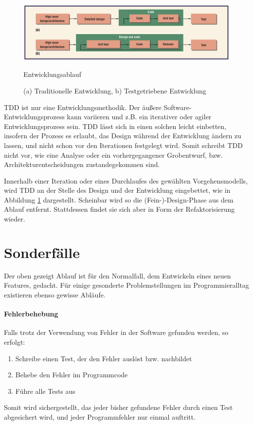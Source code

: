     \begin{figure}[hbtp]
 \centering
 \includegraphics[width=\textwidth]{./diagrams/ablauf.png}
 \caption{Entwicklungsablauf}
 \caption*{(a) Traditionelle Entwicklung,  b) Testgetriebene Entwicklung}
 \label{fig:devflow}
\end{figure}

 TDD ist nur eine Entwicklungsmethodik. Der äußere Software-Entwicklungsprozess kann variieren und z.B. ein iterativer oder agiler Entwicklungsprozess sein. TDD lässt sich in einen solchen leicht einbetten, insofern der Prozess es erlaubt, das Design während der Entwicklung ändern zu lassen, und nicht schon vor den Iterationen festgelegt wird. Somit schreibt TDD nicht vor, wie eine Analyse oder ein vorhergegangener Grobentwurf, bzw. Architekturentscheidungen zustandegekommen sind.

 Innerhalb einer Iteration oder eines Durchlaufes des gewählten Vorgehensmodells, wird TDD an der Stelle des Design und der Entwicklung eingebettet, wie in Abbildung \ref{fig:devflow} dargestellt. Scheinbar wird so die (Fein-)-Design-Phase aus dem Ablauf entfernt. Stattdessen findet sie sich aber in Form der Refaktorisierung wieder.


  \section{Sonderfälle}
  \label{sec:tddspecialcircumstances}

  Der oben gezeigt Ablauf ist für den Normalfall, dem Entwickeln eines neuen Features, gedacht. Für einige gesonderte Problemstellungen im Programmieralltag existieren ebenso gewisse Abläufe.

  \paragraph{Fehlerbehebung} Falls trotz der Verwendung von  Fehler in der Software gefunden werden, so erfolgt:
  \begin{enumerate}
   \item Schreibe einen Test, der den Fehler auslöst bzw. nachbildet
   \item Behebe den Fehler im Programmcode
   \item Führe alle Tests aus
  \end{enumerate}
  Somit wird sichergestellt, das jeder bisher gefundene Fehler durch einen Test abgesichert wird, und jeder Programmfehler nur einmal auftritt.
